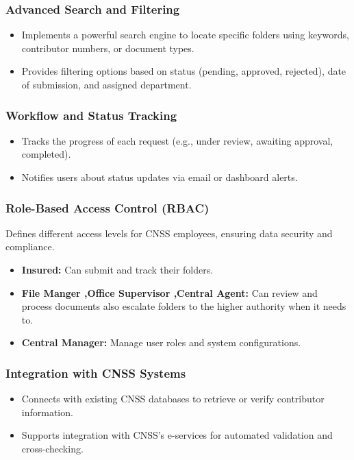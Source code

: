 \subsubsection{ Advanced Search and Filtering}
\begin{itemize}
    \item Implements a powerful search engine to locate specific folders using keywords, contributor numbers, or document types.
    \item Provides filtering options based on status (pending, approved, rejected), date of submission, and assigned department.
\end{itemize}

\subsubsection{ Workflow and Status Tracking}
\begin{itemize}
    \item Tracks the progress of each request (e.g., under review, awaiting approval, completed).
    \item Notifies users about status updates via email or dashboard alerts.
\end{itemize}

\subsubsection{ Role-Based Access Control (RBAC)}
Defines different access levels for CNSS employees, ensuring data security and compliance.
\begin{itemize}
    \item \textbf{Insured:} Can submit and track their folders.
    \item \textbf{File Manger ,Office Supervisor ,Central Agent:} Can review and process documents also escalate folders to the higher authority when it needs to.
    \item \textbf{Central Manager:} Manage user roles and system configurations.
    
\end{itemize}
\subsubsection{ Integration with CNSS Systems}
\begin{itemize}
    \item Connects with existing CNSS databases to retrieve or verify contributor information.
    \item Supports integration with CNSS’s e-services for automated validation and cross-checking.
\end{itemize}

